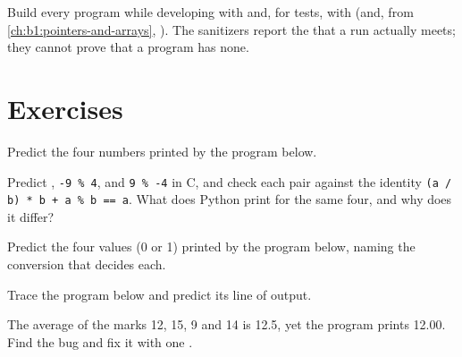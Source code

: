 \begin{safety}
Build every program while developing with  and, for tests, with
 (and, from \cref{ch:b1:pointers-and-arrays}, ). The sanitizers
report the  that a run actually meets; they cannot prove that a program has none.
\end{safety}

\section{Exercises}\label{sec:b1:c-types-and-control:exercises}

\begin{exercise}[$\star$]\label{exo:b1:c-types-and-control:1}
Predict the four numbers printed by the program below.
\end{exercise}

\begin{exercise}[$\star$]\label{exo:b1:c-types-and-control:2}
Predict , \texttt{-9 \% 4},  and \texttt{9 \% -4} in C, and check each pair against the identity
\texttt{(a / b) * b + a \% b == a}. What does Python print for the same four, and why does it differ?
\end{exercise}

\begin{exercise}[$\star$]\label{exo:b1:c-types-and-control:3}
Predict the four values (0 or 1) printed by the program below, naming the conversion that decides each.
\end{exercise}

\begin{exercise}[$\star$]\label{exo:b1:c-types-and-control:4}
Trace the program below and predict its line of output.
\end{exercise}

\begin{exercise}[$\star\star$]\label{exo:b1:c-types-and-control:5}
The average of the marks 12, 15, 9 and 14 is 12.5, yet the program prints 12.00. Find the bug and fix it with one
.
\end{exercise}

